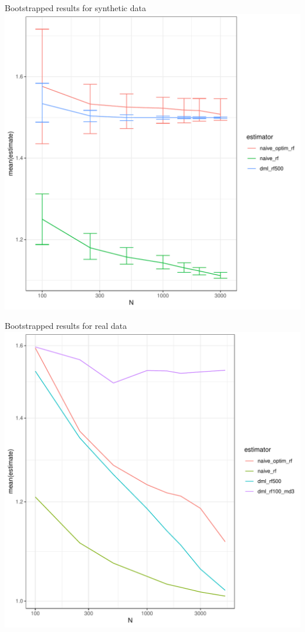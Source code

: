 \documentclass{beamer}
\begin{document}
\begin{frame}{Bootstrapped results for synthetic data}
	\includegraphics[scale=0.4]{images/avg_estimate_confint_emp}
\end{frame}

\begin{frame}{Bootstrapped results for real data}
	\includegraphics[scale=0.4]{images/avg_estimate}
\end{frame}
\end{document}
